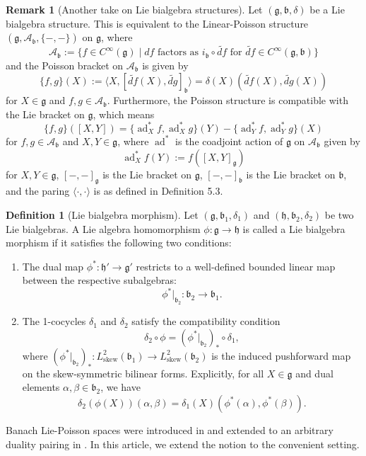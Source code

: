\documentclass[11pt,reqno]{amsart}
\theoremstyle{definition}
\newtheorem{definition}[theorem]{Definition}
\newtheorem{remark}[theorem]{Remark}
\numberwithin{equation}{section}
\begin{document}
\begin{remark}[Another take on Lie bialgebra structures]
Let $(\mathfrak{g}, \mathfrak{b}, \delta)$ be a Lie bialgebra structure. This is equivalent to the Linear-Poisson structure $(\mathfrak{g}, \mathcal{A}_{\mathfrak{b}}, \{-, -\})$ on $\mathfrak{g}$, where 
\[
\mathcal{A}_{\mathfrak{b}} := \{f \in C^{\infty}(\mathfrak{g}) \mid df \text{ factors as } i_{\mathfrak{b}} \circ \widetilde{df} \text{ for } \widetilde{df} \in C^\infty(\mathfrak{g}, \mathfrak{b})\}
\]
and the Poisson bracket on $\mathcal{A}_{\mathfrak{b}}$ is given by 
\[ 
\{f,g\}(X) :=\langle X, [\widetilde{df}(X), \widetilde{dg}]_{\mathfrak b}\rangle=\delta(X)(\widetilde{df}(X), \widetilde{dg}(X)) 
\] 
for $X \in \mathfrak{g}$ and $f, g \in \mathcal{A}_{\mathfrak{b}}$. Furthermore, the Poisson structure is compatible with the Lie bracket on $\mathfrak{g}$, which means
\[
\{f, g\}([X, Y]) = \{\operatorname{ad}^*_X f, \operatorname{ad}^*_X g\}(Y) - \{\operatorname{ad}^*_Y f, \operatorname{ad}^*_Y g\}(X)
\]
for $f, g \in \mathcal{A}_\mathfrak{b}$ and $X, Y \in \mathfrak{g}$, where $\operatorname{ad}^*$ is the coadjoint action of $\mathfrak{g}$ on $\mathcal{A}_{\mathfrak{b}}$ given by 
\[
\operatorname{ad}^*_X f(Y) := f([X, Y]_{\mathfrak g})
\] 
for $X, Y \in \mathfrak{g}$, $[-,-]_\mathfrak g$ is the Lie bracket on $\mathfrak g$, $[-,-]_{\mathfrak b}$ is the Lie bracket on $\mathfrak b$, and the paring $\langle\cdot,\cdot\rangle$ is as defined in Definition 5.3.
\end{remark}

\begin{definition}[Lie bialgebra morphism]
Let $(\mathfrak{g}, \mathfrak{b}_1, \delta_1)$ and $(\mathfrak{h}, \mathfrak{b}_2, \delta_2)$ be two Lie bialgebras. A Lie algebra homomorphism $\phi: \mathfrak{g} \to \mathfrak{h}$ is called a Lie bialgebra morphism if it satisfies the following two conditions:
\begin{enumerate}
    \item The dual map $\phi^*: \mathfrak{h}' \to \mathfrak{g}'$ restricts to a well-defined bounded linear map between the respective subalgebras:
    \[
    \phi^*|_{\mathfrak{b}_2}: \mathfrak{b}_2 \to \mathfrak{b}_1.
    \]
    \item The 1-cocycles $\delta_1$ and $\delta_2$ satisfy the compatibility condition
    \begin{equation}\label{cocycle compatibility}
    \delta_2 \circ \phi = (\phi^*|_{\mathfrak{b}_2})_* \circ \delta_1,
    \end{equation} 
    where $(\phi^*|_{\mathfrak{b}_2})_*: L^2_{\text{skew}}(\mathfrak{b}_1) \to L^2_{\text{skew}}(\mathfrak{b}_2)$ is the induced pushforward map on the skew-symmetric bilinear forms. Explicitly, for all $X \in \mathfrak{g}$ and dual elements $\alpha, \beta \in \mathfrak{b}_2$, we have
    \[
    \delta_2(\phi(X))(\alpha, \beta) = \delta_1(X)(\phi^*(\alpha), \phi^*(\beta)).
    \]
\end{enumerate}
\end{definition}
Banach Lie-Poisson spaces were introduced in \cite{27} and extended to an arbitrary duality pairing in \cite{32}. In this article, we extend the notion to the convenient setting.
\end{document}
